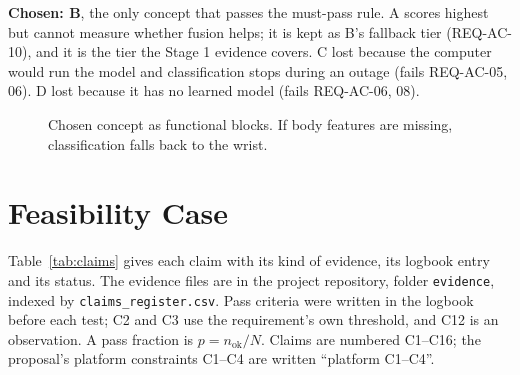 \documentclass[conference]{IEEEtran}
\begin{document}
\textbf{Chosen: B}, the only concept that passes the must-pass rule.
A scores highest but cannot measure whether fusion helps; it is kept
as B's fallback tier (REQ-AC-10), and it is the tier the Stage 1
evidence covers. C lost because the computer would run the model and
classification stops during an outage (fails REQ-AC-05, 06). D lost
because it has no learned model (fails REQ-AC-06, 08).

\begin{figure}[H]
\centering
{}
\caption{Chosen concept as functional blocks. If body features are
missing, classification falls back to the wrist.}
\label{fig:blocks}
\end{figure}

\section{Feasibility Case}
\label{sec:feasibility}

Table~\ref{tab:claims} gives each claim with its kind of evidence,
its logbook entry and its status. The evidence files are in the
project repository, folder \texttt{evidence}, indexed by
\texttt{claims\_register.csv}.
Pass criteria were written in the logbook before each test; C2 and C3 use the requirement's own threshold, and C12 is an observation. A pass
fraction is $p=n_\mathrm{ok}/N$. Claims are numbered C1--C16; the
proposal's platform constraints C1--C4 are written ``platform C1--C4''.
\end{document}
